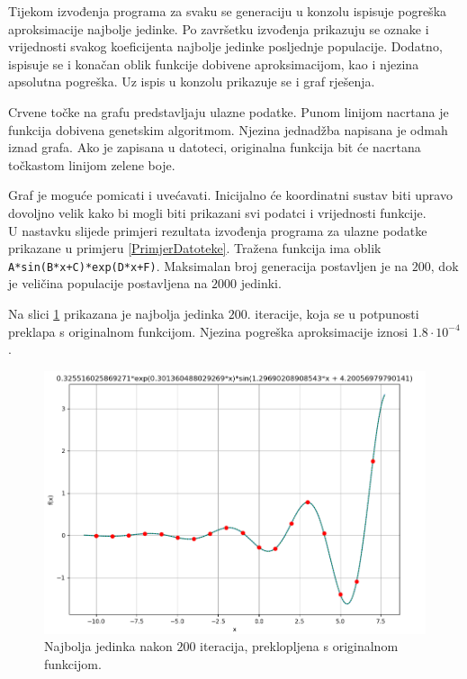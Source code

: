 \documentclass[times, utf8, seminar, numeric]{fer}
\begin{document}
Tijekom izvođenja programa za svaku se generaciju u konzolu ispisuje pogreška aproksimacije najbolje jedinke.
Po završetku izvođenja prikazuju se oznake i vrijednosti svakog koeficijenta najbolje jedinke posljednje populacije.
Dodatno, ispisuje se i konačan oblik funkcije dobivene aproksimacijom, kao i njezina apsolutna pogreška.
Uz ispis u konzolu prikazuje se i graf rješenja.

Crvene točke na grafu predstavljaju ulazne podatke.
Punom linijom nacrtana je funkcija dobivena genetskim algoritmom.
Njezina jednadžba napisana je odmah iznad grafa.
Ako je zapisana u datoteci, originalna funkcija bit će nacrtana točkastom linijom zelene boje.

Graf je moguće pomicati i uvećavati.
Inicijalno će koordinatni sustav biti upravo dovoljno velik kako bi mogli biti prikazani svi podatci i vrijednosti funkcije.\\

U nastavku slijede primjeri rezultata izvođenja programa za ulazne podatke prikazane u primjeru \ref{PrimjerDatoteke}.
Tražena funkcija ima oblik \texttt{A*sin(B*x+C)*exp(D*x+F)}.
Maksimalan broj generacija postavljen je na $200$, dok je veličina populacije postavljena na $2000$ jedinki.

Na slici \ref{Graph_GoodFreq} prikazana je najbolja jedinka $200.$ iteracije, koja se u potpunosti preklapa s originalnom funkcijom.
Njezina pogreška aproksimacije iznosi $1.8\cdot 10^{-4}$.

\begin{figure}[h]
	\centering
	\includegraphics[width=1\textwidth]{figures/Graph_GoodFreq.png}
	\caption{\label{Graph_GoodFreq}Najbolja jedinka nakon $200$ iteracija, preklopljena s originalnom funkcijom.}
\end{figure}
\end{document}
